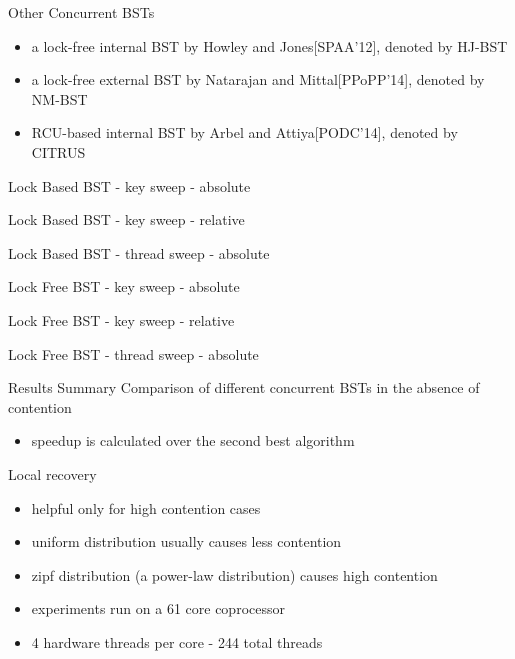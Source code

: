 \begin{frame}{Other Concurrent BSTs}
\begin{itemize}
\item a lock-free internal BST by Howley and Jones[SPAA'12], denoted by HJ-BST
\item a lock-free external BST by Natarajan and Mittal[PPoPP'14], denoted by NM-BST
\item RCU-based internal BST by Arbel and Attiya[PODC'14], denoted by CITRUS 
\end{itemize}
\end{frame}

\begin{frame}{Lock Based BST - key sweep - absolute}
%

\end{frame}

\begin{frame}{Lock Based BST - key sweep - relative}

\end{frame}

\begin{frame}{Lock Based BST - thread sweep - absolute}

\end{frame}

\begin{frame}{Lock Free BST - key sweep - absolute}
%

\end{frame}

\begin{frame}{Lock Free BST - key sweep - relative}

\end{frame}

\begin{frame}{Lock Free BST - thread sweep - absolute}

\end{frame}

\begin{frame}{Results Summary}
Comparison of different concurrent BSTs in the absence of contention

\pause
\begin{itemize}
\item speedup is calculated over the second best algorithm
\end{itemize}

\end{frame}

\begin{frame}{Local recovery}
\begin{itemize}
\item helpful only for high contention cases
\item uniform distribution usually causes less contention
\item zipf distribution (a power-law distribution) causes high contention
\item experiments run on a 61 core coprocessor
\item 4 hardware threads per core - 244 total threads
\end{itemize}
\end{frame}

